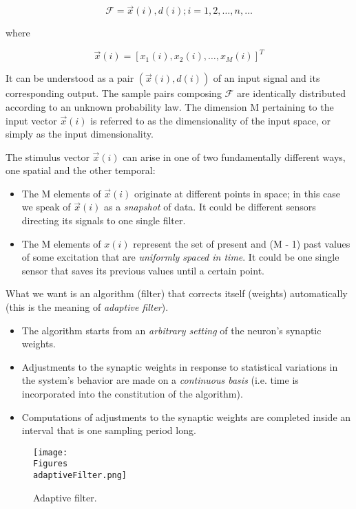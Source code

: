 \documentclass[twocolumn]{article}
\begin{document}
$$ \mathcal{F} = { \vec{x} (i), d (i); i = 1, 2, \ldots, n, \ldots} $$

\noindent where

$$ \vec{x} (i) = \left[ x_{1} (i), x_{2} (i), \ldots, x_{M} (i) \right]^{T} $$

It can be understood as a pair $( \vec{x} (i), d (i))$ of an input signal and its corresponding output. The sample pairs composing \( \mathcal{F} \) are identically distributed according to an unknown probability law. The dimension M pertaining to the input vector $ \vec{x} (i) $ is referred to as the dimensionality of the input space, or simply as the input dimensionality.

The stimulus vector $ \vec{x} (i) $ can arise in one of two fundamentally different ways, one spatial and the other temporal:

\begin{itemize}
	\item The M elements of $ \vec{x} (i) $ originate at different points in space; in this case we speak of $ \vec{x} (i) $ as a \textit{snapshot} of data. It could be different sensors directing its signals to one single filter.
	\item The M elements of $ x (i) $ represent the set of present and (M - 1) past values of some excitation that are \textit{uniformly spaced in time}. It could be one single sensor that saves its previous values until a certain point.
\end{itemize}

What we want is an algorithm (filter) that corrects itself (weights) automatically (this is the meaning of \textit{adaptive filter}).

\begin{itemize}
	\item The algorithm starts from an \textit{arbitrary setting} of the neuron's synaptic weights.
	\item Adjustments to the synaptic weights in response to statistical variations in the system's behavior are made on a \textit{continuous basis} (i.e. time is incorporated into the constitution of the algorithm).
	\item Computations of adjustments to the synaptic weights are completed inside an interval that is one sampling period long.
\end{itemize}

\begin{figure}
	\center
	\texttt{[image: \\Figures\\adaptiveFilter.png]}
	\caption{Adaptive filter.}
	\label{fig:adaptiveFilter}
\end{figure}
\end{document}
